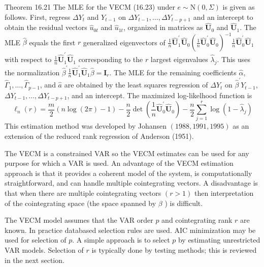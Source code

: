 \documentclass[10pt]{article}
\begin{document}
Theorem 16.21 The MLE for the VECM (16.23) under $e \sim \mathrm{N}(0, \Sigma)$ is given as follows. First, regress $\Delta Y_{t}$ and $Y_{t-1}$ on $\Delta Y_{t-1}, \ldots, \Delta Y_{t-p+1}$ and an intercept to obtain the residual vectors $\widehat{u}_{0 t}$ and $\widehat{u}_{1 t}$, organized in matrices as $\widehat{\boldsymbol{U}}_{0}$ and $\widehat{\boldsymbol{U}}_{1}$. The MLE $\widehat{\beta}$ equals the first $r$ generalized eigenvectors of $\frac{1}{n} \widehat{\boldsymbol{U}}_{1}^{\prime} \widehat{\boldsymbol{U}}_{0}\left(\frac{1}{n} \widehat{\boldsymbol{U}}_{0}^{\prime} \widehat{\boldsymbol{U}}_{0}\right)^{-1} \frac{1}{n} \widehat{\boldsymbol{U}}_{0}^{\prime} \widehat{\boldsymbol{U}}_{1}$ with respect to $\frac{1}{n} \widehat{\boldsymbol{U}}_{1}^{\prime} \widehat{\boldsymbol{U}}_{1}$ corresponding to the $r$ largest eigenvalues $\widehat{\lambda}_{j}$. This uses the normalization $\widehat{\beta}^{\prime} \frac{1}{n} \widehat{\boldsymbol{U}}_{1}^{\prime} \widehat{\boldsymbol{U}}_{1} \widehat{\beta}=\boldsymbol{I}_{r}$. The MLE for the remaining coefficients $\widehat{\alpha}$, $\widehat{\Gamma}_{1}, \ldots, \widehat{\Gamma}_{p-1}$, and $\widehat{a}$ are obtained by the least squares regression of $\Delta Y_{t}$ on $\widehat{\beta}^{\prime} Y_{t-1}$, $\Delta Y_{t-1}, \ldots, \Delta Y_{t-p+1}$, and an intercept. The maximized log-likelhood function is
$$
\ell_{n}(r)=\frac{m}{2}(n \log (2 \pi)-1)-\frac{n}{2} \operatorname{det}\left(\frac{1}{n} \widehat{\boldsymbol{U}}_{0}^{\prime} \widehat{\boldsymbol{U}}_{0}\right)-\frac{n}{2} \sum_{j=1}^{r} \log \left(1-\widehat{\lambda}_{j}\right)
$$
This estimation method was developed by Johansen $(1988,1991,1995)$ as an extension of the reduced rank regression of Anderson (1951).

The VECM is a constrained VAR so the VECM estimates can be used for any purpose for which a VAR is used. An advantage of the VECM estimation approach is that it provides a coherent model of the system, is computationally straightforward, and can handle multiple cointegrating vectors. A disadvantage is that when there are multiple cointegrating vectors $(r>1)$ then interpretation of the cointegrating space (the space spanned by $\beta$ ) is difficult.

The VECM model assumes that the VAR order $p$ and cointegrating rank $r$ are known. In practice databased selection rules are used. AIC minimization may be used for selection of $p$. A simple approach is to select $p$ by estimating unrestricted VAR models. Selection of $r$ is typically done by testing methods; this is reviewed in the next section.
\end{document}

